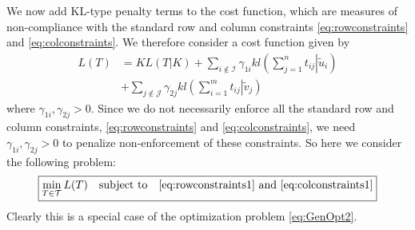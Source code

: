 \documentclass[twocolumn]{article}
\newtheorem{remark}{Remark}
\begin{document}
We  now add KL-type penalty terms to the cost function, 
which are measures of non-compliance with the standard  row and column constraints \eqref{eq:rowconstraints} and \eqref{eq:colconstraints}.
We therefore consider a  cost function given by
\begin{equation}
\label{eq:lt}
\begin{aligned}
L(T) &= KL(T|K)
+ \sum_{i \notin \mathcal{I}}  \gamma_{1i} kl\left(\left. \sum_{j=1}^n  t_{ij} \right| \tilde{u}_i\right) \nonumber\\
&+ \sum_{j \notin \mathcal{J}} \gamma_{2j} kl\left(\left. \sum_{i=1}^m  t_{ij} \right| \tilde{v}_j \right)
\end{aligned} 
\end{equation}
where 
$\gamma_{1i}, \gamma_{2j}>0$.
Since we do not necessarily enforce all the standard row and  column constraints, \eqref{eq:rowconstraints} and \eqref{eq:colconstraints},  
we need $\gamma _{1i}, \gamma_{2j}>0$ to penalize non-enforcement of these constraints. 
So here we consider the following problem:
\begin{equation}
\label{eq:GenOpt}
\fbox{$\displaystyle
\min_{T \in \mathcal{T}} L(T)\quad  \text{subject to} \quad \eqref{eq:rowconstraints1} \text{ and } \eqref{eq:colconstraints1}
$}
\end{equation}
Clearly this is a special case of the optimization problem \eqref{eq:GenOpt2}.








\end{document}
